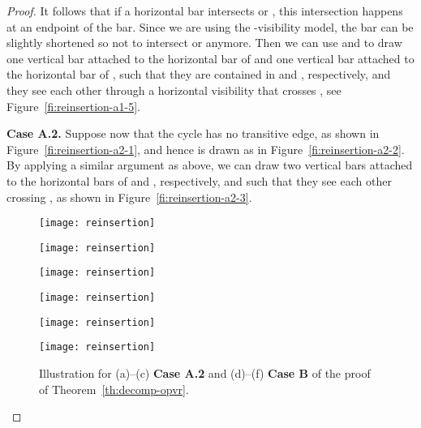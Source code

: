 \documentclass{article}
\begin{document}
\begin{proof}
It follows that if a horizontal bar intersects  or , this intersection happens at an endpoint of the bar. Since we are using the -visibility model, the bar can be slightly shortened so not to intersect  or  anymore. Then we can use  and   to draw one vertical bar attached to the horizontal bar of  and one vertical bar attached to the horizontal bar of , such that they are contained in  and , respectively, and they see each other through a horizontal visibility that crosses , see Figure~\ref{fi:reinsertion-a1-5}.



{\bf Case A.2.} Suppose now that the cycle  has no transitive edge, as shown in Figure~\ref{fi:reinsertion-a2-1}, and hence is drawn as in Figure~\ref{fi:reinsertion-a2-2}. By applying a similar argument as above, we can draw two vertical bars attached to the horizontal bars of  and , respectively, and such that they see each other crossing , as shown in Figure~\ref{fi:reinsertion-a2-3}.


\begin{figure}[t]
    \centering  
    \begin{minipage}[b]{.31\textwidth}
    	\centering
    	\texttt{[image: reinsertion]}
    	\subcaption{}\label{fi:reinsertion-a2-1}
    \end{minipage}
    \begin{minipage}[b]{.31\textwidth}
    	\centering
    	\texttt{[image: reinsertion]}
    	\subcaption{}\label{fi:reinsertion-a2-2}
    \end{minipage}
    \begin{minipage}[b]{.31\textwidth}
    	\centering
    	\texttt{[image: reinsertion]}
    	\subcaption{}\label{fi:reinsertion-a2-3}
    \end{minipage}
    \begin{minipage}[b]{.31\textwidth}
    	\centering
    	\texttt{[image: reinsertion]}
    	\subcaption{}\label{fi:reinsertion-b-1}
    \end{minipage}
    \begin{minipage}[b]{.31\textwidth}
    	\centering
    	\texttt{[image: reinsertion]}
    	\subcaption{}\label{fi:reinsertion-b-2}
    \end{minipage}
    \begin{minipage}[b]{.31\textwidth}
    	\centering
    	\texttt{[image: reinsertion]}
    	\subcaption{}\label{fi:reinsertion-b-3}
    \end{minipage}
    \caption{Illustration for (a)--(c) {\bf Case A.2} and (d)--(f) {\bf Case B} of the proof of Theorem~\ref{th:decomp-opvr}.}
\end{figure}



\end{proof}
\end{document}
